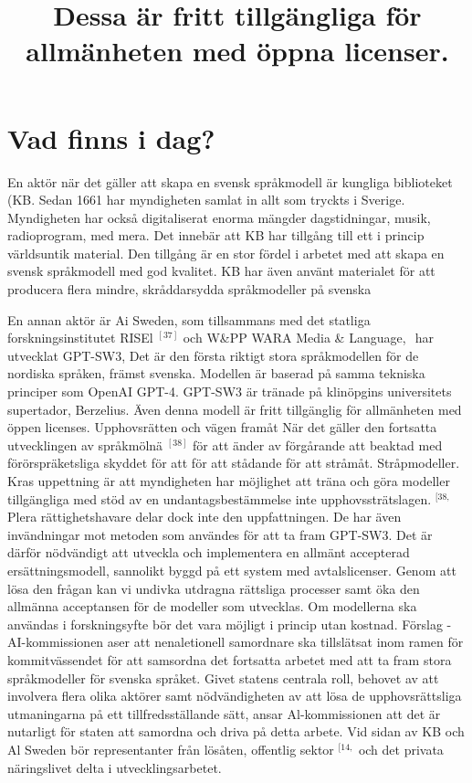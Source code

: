{{{{{{{{{{{{{{\section*{Vad finns i dag?}
En aktör när det gäller att skapa en svensk språkmodell är kungliga biblioteket (KB. Sedan 1661 har myndigheten samlat in allt som tryckts i Sverige. Myndigheten har också digitaliserat enorma mängder dagstidningar, musik, radioprogram, med mera. Det innebär att KB har tillgång till ett i princip världsuntik material. Den tillgång är en stor fördel i arbetet med att skapa en svensk språkmodell med god kvalitet. KB har även använt materialet för att producera flera mindre, skråddarsydda språkmodeller på svenska

\title{
Dessa är fritt tillgängliga för allmänheten med öppna licenser.
}
En annan aktör är Ai Sweden, som tillsammans med det statliga forskningsinstitutet RISEl \({ }^{[37]}\) och W\&PP WARA Media \& Language, \({ }^{}\) har utvecklat GPT-SW3, Det är den första riktigt stora språkmodellen för de nordiska språken, främst svenska. Modellen är baserad på samma tekniska principer som OpenAI GPT-4. GPT-SW3 är tränade på klinöpgins universitets supertador, Berzelius. Även denna modell är fritt tillgänglig för allmänheten med öppen licenses.
Upphovsrätten och vägen framåt När det gäller den fortsatta utvecklingen av språkmölnä \(^{[38]}\) för att änder av förgårande att beaktad med förörspräketsliga skyddet för att för att stådande för att stråmåt. Stråpmodeller. Kras uppettning är att myndigheten har möjlighet att träna och göra modeller tillgängliga med stöd av en undantagsbestämmelse inte upphovssträtslagen. \({ }^{[38,}\) Plera rättighetshavare delar dock inte den uppfattningen. De har även invändningar mot metoden som användes för att ta fram GPT-SW3. Det är därför nödvändigt att utveckla och implementera en allmänt accepterad ersättningsmodell, sannolikt byggd på ett system med avtalslicenser. Genom att lösa den frågan kan vi undivka utdragna rättsliga processer samt öka den allmänna acceptansen för de modeller som utvecklas. Om modellerna ska användas i forskningsyfte bör det vara möjligt i princip utan kostnad.
Förslag
- AI-kommissionen aser att nenaletionell samordnare ska tillslätsat inom ramen för kommitvässendet för att samsordna det fortsatta arbetet med att ta fram stora språkmodeller för svenska språket. Givet statens centrala roll, behovet av att involvera flera olika aktörer samt nödvändigheten av att lösa de upphovsrättsliga utmaningarna på ett tillfredsställande sätt, ansar Al-kommissionen att det är nutarligt för staten att samordna och driva på detta arbete. Vid sidan av KB och Al Sweden bör representanter från lösåten, offentlig sektor \({ }^{[14,}\) och det privata näringslivet delta i utvecklingsarbetet.
}}}}}}}}}}}}}}

